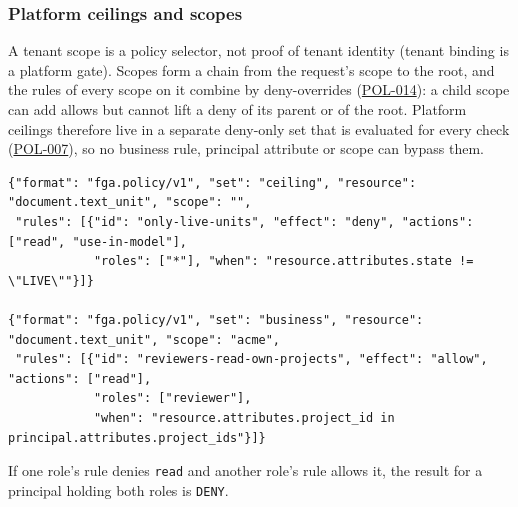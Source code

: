 \documentclass[11pt,a4paper]{article}
\newcommand{\code}[1]{{\small\nolinkurl{#1}}}
\newcommand{\rr}[1]{\hyperlink{req:#1}{#1}}
\begin{document}
\subsubsection{Platform ceilings and scopes}
A tenant scope is a policy selector, not proof of tenant identity (tenant binding is a platform gate). Scopes form a chain from the request's scope to the root, and the rules of every scope on it combine by deny-overrides (\rr{POL-014}): a child scope can add allows but cannot lift a deny of its parent or of the root. Platform ceilings therefore live in a separate deny-only set that is evaluated for every check (\rr{POL-007}), so no business rule, principal attribute or scope can bypass them.
\begin{lstlisting}
{"format": "fga.policy/v1", "set": "ceiling", "resource": "document.text_unit", "scope": "",
 "rules": [{"id": "only-live-units", "effect": "deny", "actions": ["read", "use-in-model"],
            "roles": ["*"], "when": "resource.attributes.state != \"LIVE\""}]}

{"format": "fga.policy/v1", "set": "business", "resource": "document.text_unit", "scope": "acme",
 "rules": [{"id": "reviewers-read-own-projects", "effect": "allow", "actions": ["read"],
            "roles": ["reviewer"],
            "when": "resource.attributes.project_id in principal.attributes.project_ids"}]}
\end{lstlisting}
If one role's rule denies \code{read} and another role's rule allows it, the result for a principal holding both roles is \code{DENY}.
\end{document}
